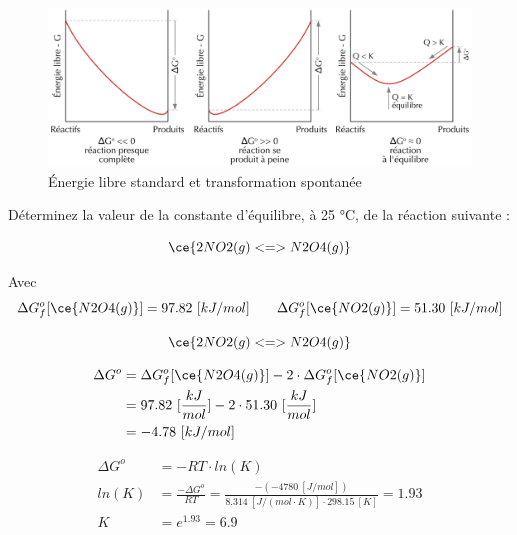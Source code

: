 \documentclass[
  11pt,
  french,
  a4paper,
  openany]{book}
\begin{document}
\begin{figure}

{\centering \includegraphics[width=1\linewidth]{images/dG-profile} 

}

\caption{Énergie libre standard et transformation spontanée}\label{fig:dG-profile}
\end{figure}

\clearpage

\begin{Exercise}

Déterminez la valeur de la constante d'équilibre, à 25 °C, de la réaction suivante :

\[
\ce{2 NO2(g) <=> N2O4(g)}
\]

Avec
\[
\begin{split}
\Delta G^o_f[\ce{N2O4(g)}] = 97.82\ [kJ/mol]
\end{split}
\qquad
\begin{split}
\Delta G^o_f[\ce{NO2(g)}] = 51.30\ [kJ/mol]
\end{split}
\]



\end{Exercise}

\begin{Answer}

\[
\ce{2 NO2(g) <=> N2O4(g)}
\]

\[
\begin{split}
\Delta G^o &= \Delta G^o_f[\ce{N2O4(g)}] - 2 \cdot \Delta G^o_f[\ce{NO2(g)}] \\
&= 97.82\ [\frac{kJ}{mol}] - 2 \cdot 51.30\ [\frac{kJ}{mol}] \\
&= -4.78\ [kJ/mol]
\end{split}
\]

\[
\begin{split}
\Delta G^o &= - RT \cdot ln(K) \\
ln(K) &= \frac{- \Delta G^o}{RT} = \frac{- (-4780\ [J/mol])}{8.314\ [J/(mol \cdot K)] \cdot 298.15\ [K]} = 1.93 \\
K &= e^{1.93} = 6.9
\end{split}
\]

\clearpage


\end{Answer}
\end{document}

